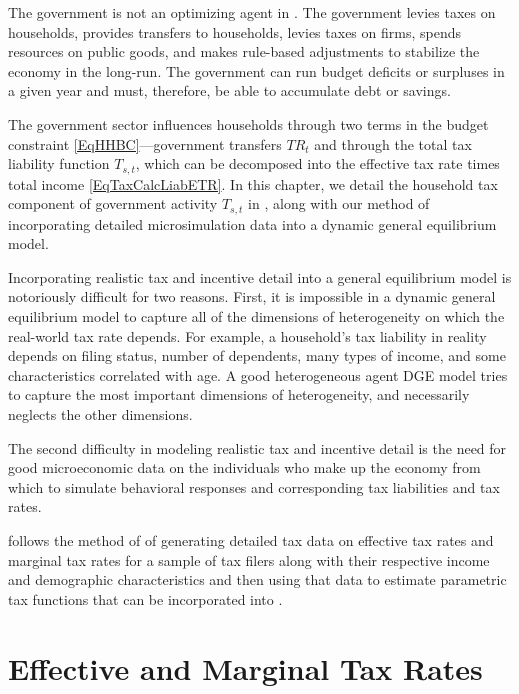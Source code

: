 
The government is not an optimizing agent in \ogindia. The government levies taxes on households, provides transfers to households, levies taxes on firms, spends resources on public goods, and makes rule-based adjustments to stabilize the economy in the long-run. The government can run budget deficits or surpluses in a given year and must, therefore, be able to accumulate debt or savings.

The government sector influences households through two terms in the budget constraint \eqref{EqHHBC}---government transfers $TR_{t}$ and through the total tax liability function $T_{s,t}$, which can be decomposed into the effective tax rate times total income \eqref{EqTaxCalcLiabETR}. In this chapter, we detail the household tax component of government activity $T_{s,t}$ in \ogindia, along with our method of incorporating detailed microsimulation data into a dynamic general equilibrium model.

Incorporating realistic tax and incentive detail into a general equilibrium model is notoriously difficult for two reasons. First, it is impossible in a dynamic general equilibrium model to capture all of the dimensions of heterogeneity on which the real-world tax rate depends. For example, a household's tax liability in reality depends on filing status, number of dependents, many types of income, and some characteristics correlated with age. A good heterogeneous agent DGE model tries to capture the most important dimensions of heterogeneity, and necessarily neglects the other dimensions.

The second difficulty in modeling realistic tax and incentive detail is the need for good microeconomic data on the individuals who make up the economy from which to simulate behavioral responses and corresponding tax liabilities and tax rates.

\ogindia follows the method of \citet{DeBackerEtAl:2017} of generating detailed tax data on effective tax rates and marginal tax rates for a sample of tax filers along with their respective income and demographic characteristics and then using that data to estimate parametric tax functions that can be incorporated into \ogindia.


\section{Effective and Marginal Tax Rates}\label{SecTaxCalcRateTheory}

